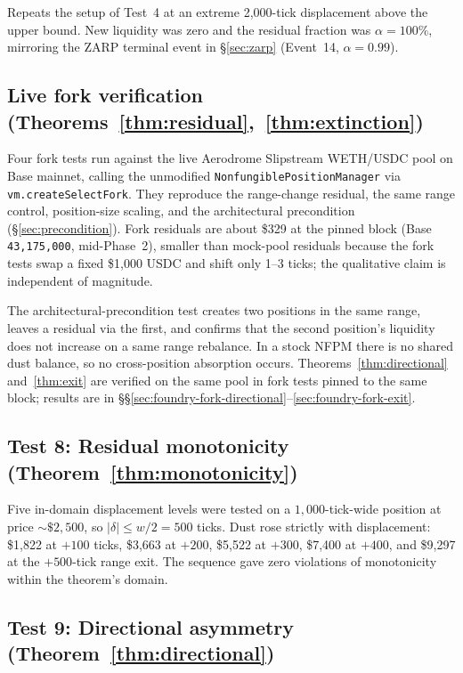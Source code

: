 \documentclass[11pt,a4paper]{article}
\theoremstyle{plain}
\begin{document}
Repeats the setup of Test~4 at an extreme 2{,}000-tick displacement above the upper bound. New liquidity was zero and the residual fraction was $\alpha = 100\%$, mirroring the ZARP terminal event in \S\ref{sec:zarp} (Event~14, $\alpha = 0.99$).

\subsection{Live fork verification (Theorems~\ref{thm:residual},~\ref{thm:extinction})}\label{sec:foundry-fork}

Four fork tests run against the live Aerodrome Slipstream WETH/USDC pool on Base mainnet, calling the unmodified \texttt{NonfungiblePositionManager} via \texttt{vm.createSelectFork}. They reproduce the range-change residual, the same range control, position-size scaling, and the architectural precondition (\S\ref{sec:precondition}). Fork residuals are about \$329 at the pinned block (Base \texttt{43{,}175{,}000}, mid-Phase~2), smaller than mock-pool residuals because the fork tests swap a fixed \$1{,}000 USDC and shift only 1--3 ticks; the qualitative claim is independent of magnitude.

The architectural-precondition test creates two positions in the same range, leaves a residual via the first, and confirms that the second position's liquidity does not increase on a same range rebalance. In a stock NFPM there is no shared dust balance, so no cross-position absorption occurs. Theorems~\ref{thm:directional} and~\ref{thm:exit} are verified on the same pool in fork tests pinned to the same block; results are in \S\S\ref{sec:foundry-fork-directional}--\ref{sec:foundry-fork-exit}.

\subsection{Test 8: Residual monotonicity (Theorem~\ref{thm:monotonicity})}\label{sec:foundry-monotonicity}

Five in-domain displacement levels were tested on a $1{,}000$-tick-wide position at price ${\sim}\$2{,}500$, so $|\delta| \leq w/2 = 500$ ticks. Dust rose strictly with displacement: \$1{,}822 at $+100$ ticks, \$3{,}663 at $+200$, \$5{,}522 at $+300$, \$7{,}400 at $+400$, and \$9{,}297 at the $+500$-tick range exit. The sequence gave zero violations of monotonicity within the theorem's domain.

\subsection{Test 9: Directional asymmetry (Theorem~\ref{thm:directional})}\label{sec:foundry-directional}
\end{document}
